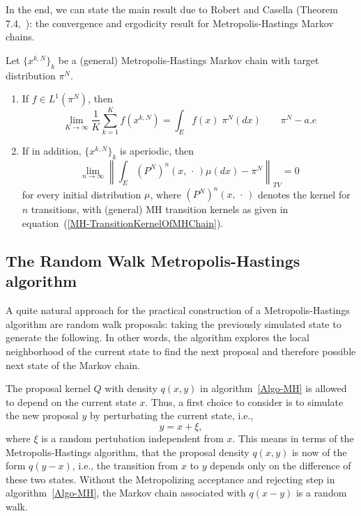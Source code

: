 In the end, we can state the main result due to Robert and Casella (Theorem 7.4,~\autocite{Robert2005}): the convergence and ergodicity result for Metropolis-Hastings Markov chains.

\begin{thm}
\label{Theorem-Ergodicity}
 Let  $ \{ x^{k,N} \}_{k} $ be a (general) Metropolis-Hastings Markov chain with target distribution $ \pi^{N} $.
 \begin{enumerate}
  \item If $ f \in L^1( \pi^{N} ) $, then
  \begin{equation}
  \label{Theorem-Ergodicity-Statement1}
   \lim_{K \to \infty} \frac{1}{K} \sum_{k = 1}^{K} f \left( x^{k,N} \right) = \int_E f(x) \; \pi^{N}(dx) \qquad \pi^{N}-a.e
  \end{equation}
  
  \item If in addition, $ \{ x^{k,N} \}_{k} $ is aperiodic, then
  \begin{equation}
  \label{Theorem-Ergodicity-Statement2}
   \lim_{n \to \infty} \left\| \int_E \left( P^{N} \right)^n (x, \, \cdot \, ) \mu(dx) -  \pi^{N}   \right\|_{TV} = 0
  \end{equation}
  for every initial distribution $\mu$, where $ \left( P^{N} \right)^n (x, \, \cdot \, ) $ denotes the kernel for $n$ transitions, with (general) MH transition kernels as given in equation~(\ref{MH-TransitionKernelOfMHChain}).

 \end{enumerate}
  
\end{thm}






\subsection{The Random Walk Metropolis-Hastings algorithm}
\label{MH-RWM}

A quite natural approach for the practical construction of a Metropolis-Hastings algorithm are random walk proposals: taking the previously simulated state to generate the following. In other words, the algorithm explores the local neighborhood of the current state to find the next proposal and therefore possible next state of the Markov chain.

The proposal kernel $Q$ with density $ q(x,y) $ in algorithm~\ref{Algo-MH} is allowed to depend on the current state $x$. Thus, a first choice to consider is to simulate the new proposal $ y $ by perturbating the current state, i.e.,
\begin{equation}
 \label{MH-RWM:RWM-proposals, First choice}
 y = x + \xi,
\end{equation}
where $ \xi $ is a random pertubation independent from $ x $. This means in terms of the Metropolis-Hastings algorithm, that the proposal density $ q(x,y) $ is now of the form $ q(y-x) $, i.e., the transition from $x$ to $y$ depends only on the difference of these two states. Without the Metropolizing acceptance and rejecting step in algorithm~\ref{Algo-MH}, the Markov chain associated with $q(x-y)$ is a random walk.



